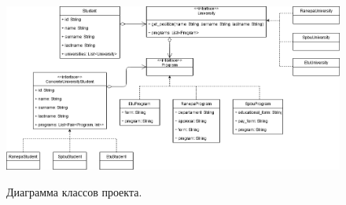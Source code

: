 \documentclass[a4paper,article,14pt]{extarticle}
\begin{document}
\begin{figure} [ht]
\begin{center}
\scalebox{0.5} {
    \includegraphics{images/classdiagram.png}
}

\caption{
\label{diagram}
	Диаграмма классов проекта.
}
\end{center}
\end{figure}
\end{document}
